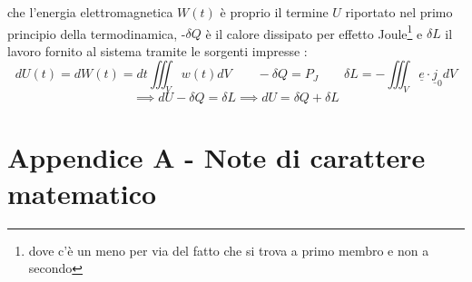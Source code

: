 \documentclass{book}
\begin{document}
        che l'energia elettromagnetica $W(t)$ è proprio il termine $U$ riportato nel primo principio della termodinamica, -$\delta Q$ è il calore dissipato per effetto Joule\footnote{dove c'è un meno per via del fatto che si trova a primo membro e non a secondo}
        e $\delta L$ il lavoro fornito al sistema tramite le sorgenti impresse :
        \begin{equation}
                dU(t) = dW(t) = dt\iiint_{V} w(t)dV \qquad -\delta Q =P_{J}   \qquad \delta L = - \iiint_{V} \underline{e} \cdot \underline{j}_{0}dV
        \end{equation}
        \begin{equation}
            \implies dU-\delta Q = \delta L \implies dU = \delta Q + \delta L
        \end{equation}
\chapter*{Appendice A - Note di carattere matematico}
\end{document}
